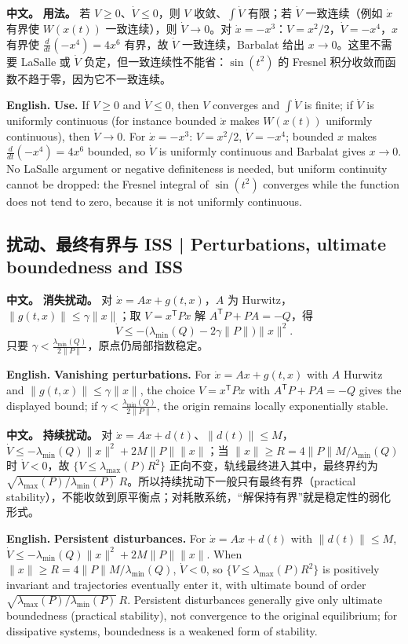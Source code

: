 \documentclass[UTF8,11pt,a4paper]{ctexart}
\newcommand{\APS}[2]{\par\noindent\textbf{中文。} #1\par\noindent\textbf{English.} #2\par}
\newcommand{\norm}[1]{\lVert #1\rVert}\newcommand{\abs}[1]{\lvert #1\rvert}
\begin{document}
\APS{\textbf{用法。} 若 $V\ge0$、$\dot V\le0$，则 $V$ 收敛、$\int\dot V$ 有限；若 $\dot V$ 一致连续（例如 $\dot x$ 有界使 $W(x(t))$ 一致连续），则 $\dot V\to0$。对 $\dot x=-x^3$：$V=x^2/2$，$\dot V=-x^4$，$x$ 有界使 $\frac{d}{dt}(-x^4)=4x^6$ 有界，故 $\dot V$ 一致连续，Barbalat 给出 $x\to0$。这里不需要 LaSalle 或 $\dot V$ 负定，但一致连续性不能省：$\sin(t^2)$ 的 Fresnel 积分收敛而函数不趋于零，因为它不一致连续。}{\textbf{Use.} If $V\ge0$ and $\dot V\le0$, then $V$ converges and $\int\dot V$ is finite; if $\dot V$ is uniformly continuous (for instance bounded $\dot x$ makes $W(x(t))$ uniformly continuous), then $\dot V\to0$. For $\dot x=-x^3$: $V=x^2/2$, $\dot V=-x^4$; bounded $x$ makes $\frac{d}{dt}(-x^4)=4x^6$ bounded, so $\dot V$ is uniformly continuous and Barbalat gives $x\to0$. No LaSalle argument or negative definiteness is needed, but uniform continuity cannot be dropped: the Fresnel integral of $\sin(t^2)$ converges while the function does not tend to zero, because it is not uniformly continuous.}

\subsection{扰动、最终有界与 ISS | Perturbations, ultimate boundedness and ISS}
\APS{\textbf{消失扰动。} 对 $\dot x=Ax+g(t,x)$，$A$ 为 Hurwitz，$\norm{g(t,x)}\le\gamma\norm{x}$；取 $V=x^{\mathsf T}Px$ 解 $A^{\mathsf T}P+PA=-Q$，得
\[
\dot V\le-\bigl(\lambda_{\min}(Q)-2\gamma\norm{P}\bigr)\norm{x}^2 .
\]
只要 $\gamma<\frac{\lambda_{\min}(Q)}{2\norm{P}}$，原点仍局部指数稳定。}{\textbf{Vanishing perturbations.} For $\dot x=Ax+g(t,x)$ with $A$ Hurwitz and $\norm{g(t,x)}\le\gamma\norm{x}$, the choice $V=x^{\mathsf T}Px$ with $A^{\mathsf T}P+PA=-Q$ gives the displayed bound; if $\gamma<\frac{\lambda_{\min}(Q)}{2\norm{P}}$, the origin remains locally exponentially stable.}

\APS{\textbf{持续扰动。} 对 $\dot x=Ax+d(t)$、$\norm{d(t)}\le M$，$\dot V\le-\lambda_{\min}(Q)\norm{x}^2+2M\norm{P}\norm{x}$；当 $\norm{x}\ge R=4\norm{P}M/\lambda_{\min}(Q)$ 时 $\dot V<0$，故 $\{V\le\lambda_{\max}(P)R^2\}$ 正向不变，轨线最终进入其中，最终界约为 $\sqrt{\lambda_{\max}(P)/\lambda_{\min}(P)}\,R$。所以持续扰动下一般只有最终有界（practical stability），不能收敛到原平衡点；对耗散系统，“解保持有界”就是稳定性的弱化形式。}{\textbf{Persistent disturbances.} For $\dot x=Ax+d(t)$ with $\norm{d(t)}\le M$, $\dot V\le-\lambda_{\min}(Q)\norm{x}^2+2M\norm{P}\norm{x}$. When $\norm{x}\ge R=4\norm{P}M/\lambda_{\min}(Q)$, $\dot V<0$, so $\{V\le\lambda_{\max}(P)R^2\}$ is positively invariant and trajectories eventually enter it, with ultimate bound of order $\sqrt{\lambda_{\max}(P)/\lambda_{\min}(P)}\,R$. Persistent disturbances generally give only ultimate boundedness (practical stability), not convergence to the original equilibrium; for dissipative systems, boundedness is a weakened form of stability.}
\end{document}
